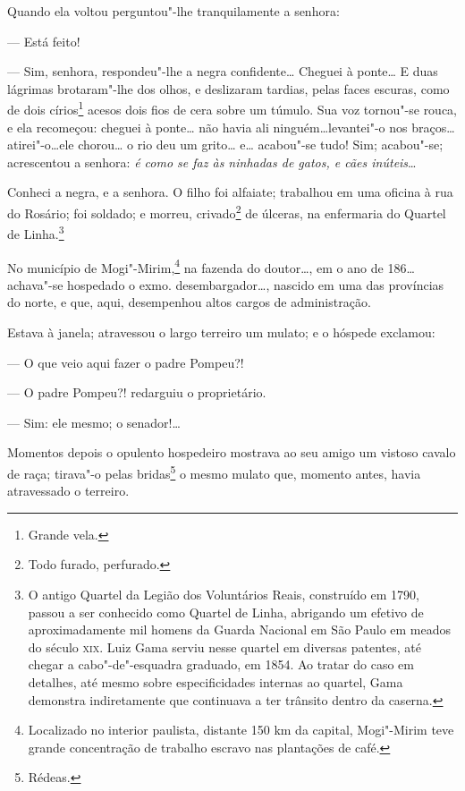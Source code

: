   Quando ela voltou perguntou"-lhe tranquilamente a senhora:

  --- Está feito!

--- Sim, senhora, respondeu"-lhe a negra confidente\ldots{} Cheguei à
ponte\ldots{} E duas lágrimas brotaram"-lhe dos olhos, e deslizaram tardias,
pelas faces escuras, como de dois círios\footnote{Grande vela.} acesos
dois fios de cera sobre um túmulo. Sua voz tornou"-se rouca, e ela
recomeçou: cheguei à ponte\ldots{} não havia ali ninguém\ldots{}levantei"-o nos
braços\ldots{}atirei"-o\ldots{}ele chorou\ldots{} o rio deu um grito\ldots{} e\ldots{} acabou"-se
tudo! Sim; acabou"-se; acrescentou a senhora: \emph{é como se faz às
ninhadas de gatos, e cães inúteis}\ldots{}

Conheci a negra, e a senhora. O filho foi alfaiate; trabalhou em uma
oficina à rua do Rosário; foi soldado; e morreu, crivado\footnote{Todo
  furado, perfurado.} de úlceras, na enfermaria do Quartel de
Linha.\footnote{O antigo Quartel da Legião dos Voluntários Reais,
  construído em 1790, passou a ser conhecido como Quartel de Linha,
  abrigando um efetivo de aproximadamente mil homens da Guarda Nacional
  em São Paulo em meados do século \textsc{xix}. Luiz Gama serviu nesse quartel
  em diversas patentes, até chegar a cabo"-de"-esquadra graduado, em 1854.
  Ao tratar do caso em detalhes, até mesmo sobre especificidades
  internas ao quartel, Gama demonstra indiretamente que continuava a ter
  trânsito dentro da caserna.}

\asterisc

No município de Mogi"-Mirim,\footnote{Localizado no interior paulista,
  distante 150 km da capital, Mogi"-Mirim teve grande concentração de
  trabalho escravo nas plantações de café.} na fazenda do doutor\ldots{}, em
o ano de 186\ldots{} achava"-se hospedado o exmo. desembargador\ldots{}, nascido em
uma das províncias do norte, e que, aqui, desempenhou altos cargos de
administração.

Estava à janela; atravessou o largo terreiro um mulato; e o hóspede
exclamou:

--- O que veio aqui fazer o padre Pompeu?!

--- O padre Pompeu?! redarguiu o proprietário.

--- Sim: ele mesmo; o senador!\ldots{}

Momentos depois o opulento hospedeiro mostrava ao seu amigo um vistoso
  cavalo de raça; tirava"-o pelas bridas\footnote{Rédeas.} o mesmo
  mulato que, momento antes, havia atravessado o terreiro.

